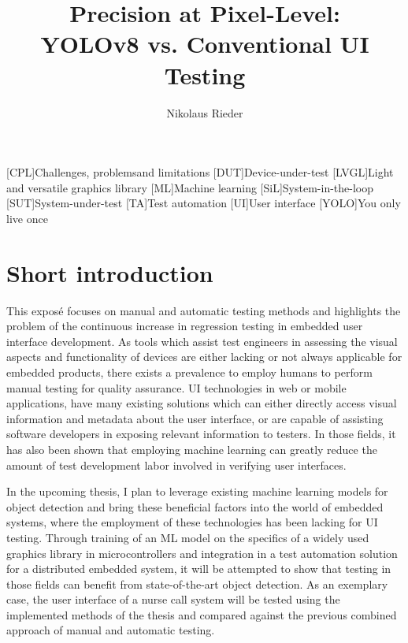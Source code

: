 \documentclass[Proposal,BIC,english,IEEE]{BASE/twbook} %
\title{Precision at Pixel-Level:\\YOLOv8 vs. Conventional UI Testing}
\author{Nikolaus Rieder}
\begin{document}
\maketitle

{}
\chapter*{\listacroname}
\begin{acronym}[XXXXX]
    [CPL]{Challenges, problemsand limitations}
    [DUT]{Device-under-test}
    [LVGL]{Light and versatile graphics library}
    [ML]{Machine learning}
    [SiL]{System-in-the-loop}
    [SUT]{System-under-test}
    [TA]{Test automation}
    [UI]{User interface}
    [YOLO]{You only live once}
\end{acronym}
\chapter{Short introduction}
This exposé focuses on manual and automatic testing methods and highlights the problem of the continuous increase in regression testing in embedded user interface development. As tools which assist test engineers in assessing the visual aspects and functionality of devices are either lacking or not always applicable for embedded products, there exists a prevalence to employ humans to perform manual testing for quality assurance. UI technologies in web or mobile applications, have many existing solutions which can either directly access visual information and metadata about the user interface, or are capable of assisting software developers in exposing relevant information to testers. In those fields, it has also been shown that employing machine learning can greatly reduce the amount of test development labor involved in verifying user interfaces.

In the upcoming thesis, I plan to leverage existing machine learning models for object detection and bring these beneficial factors into the world of embedded systems, where the employment of these technologies has been lacking for UI testing. Through training of an ML model on the specifics of a widely used graphics library in microcontrollers and integration in a test automation solution for a distributed embedded system, it will be attempted to show that testing in those fields can benefit from state-of-the-art object detection. As an exemplary case, the user interface of a nurse call system will be tested using the implemented methods of the thesis and compared against the previous combined approach of manual and automatic testing.
\end{document}
